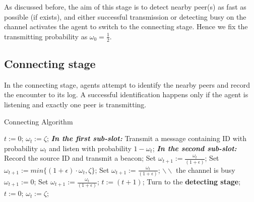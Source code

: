 As discussed before, the aim of this stage is to detect nearby peer(s) as fast as possible 
(if exists), and either successful transmission or detecting busy on the channel activates the agent
to switch to the connecting stage. Hence we fix the transmitting probability as $\omega_0 = \frac{1}{2}$. 


\subsection{Connecting stage}

In the connecting stage, agents attempt to identify the nearby 
peers and record the encounter to its log.
A successful identification happens only if the agent is listening
and exactly one peer is transmitting. 

\begin{algorithm}[ht]
    \caption{Connecting Algorithm}
    \label{CA}
    \begin{algorithmic}[1]
    \STATE $t := 0$; $\omega_t := \zeta$; 
        \STATE \textbf{\emph{In the first sub-slot:}}
        \STATE Transmit a message containing ID with probability $\omega_t$
        and listen with probability $1-\omega_t$;
        \STATE \textbf{\emph{In the second sub-slot:}}
                \STATE Record the source ID and transmit a beacon;
                \STATE Set $\omega_{t+1} := \frac{\omega_t}{(1+\epsilon)}$;
                \STATE Set $\omega_{t+1} := min\{(1+\epsilon)\cdot\omega_t, \zeta\}$;
            \ELSE
                \STATE Set $\omega_{t+1} := \frac{\omega_t}{(1+\epsilon)}$; $\backslash\backslash$ the channel is busy
            \ENDIF
        \ELSE
                \STATE $\omega_{t+1} := 0$;
            \ELSE
                \STATE Set $\omega_{t+1} := \frac{\omega_t}{(1+\epsilon)}$;
            \ENDIF
        \ENDIF
        \STATE $t := (t + 1)$;
                \STATE Turn to the \textbf{detecting stage}; \label{backDS}
            \ELSE
                \STATE $t := 0$; $\omega_t := \zeta$;
            \ENDIF
        \ENDIF
    \ENDWHILE
    \end{algorithmic}
\end{algorithm}



